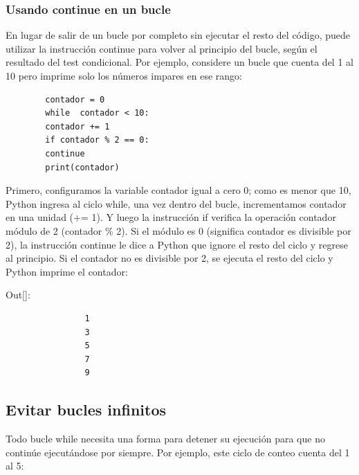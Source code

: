 	
	
	\subsubsection{Usando {\ttfamily continue} en un bucle}
	
	En lugar de salir de un bucle por completo sin ejecutar el resto del código, puede utilizar la instrucción {\ttfamily continue} para volver al principio del bucle, según el resultado del test condicional. Por ejemplo, considere un bucle que cuenta del 1 al 10 pero imprime solo los números impares en ese rango:
	
	\hspace{-2.5cm}{\ttfamily \scriptsize contador.py} \vspace{-0.55cm}
	\begin{lstlisting}		
		contador = 0
		while  contador < 10:
		contador += 1
		if contador % 2 == 0:
		continue    
		print(contador)	
	\end{lstlisting}	
	
	
	Primero, configuramos la variable {\ttfamily contador} igual a cero 0; como es menor que 10, Python ingresa al ciclo {\ttfamily while}, una vez dentro del bucle, incrementamos {\ttfamily contador} en una unidad ({\ttfamily += 1}).  Y luego la instrucción {\ttfamily if}  verifica la  operación {\ttfamily contador} módulo de 2 ({\ttfamily contador \% 2}). Si el módulo es 0 (significa {\ttfamily contador} es divisible por 2), la instrucción {\ttfamily continue} le dice a Python que ignore el resto del ciclo y regrese al principio. Si el  {\ttfamily contador} no es divisible por 2, se ejecuta el resto del ciclo y Python imprime el  {\ttfamily contador}:\vspace{0.09cm}
	
	{\ttfamily\scriptsize\scriptsize \noindent Out[]:\vspace{-0.3cm}	
		{\color{blue} 	
			\begin{verbatim}
				1
				3
				5
				7
				9		
			\end{verbatim}
	}}
	
	
	\subsection{Evitar bucles infinitos}
	
	Todo  bucle  {\ttfamily while} necesita una forma para detener su ejecución para que no continúe ejecutándose por siempre. Por ejemplo, este ciclo de conteo cuenta  del 1 al 5:
	
